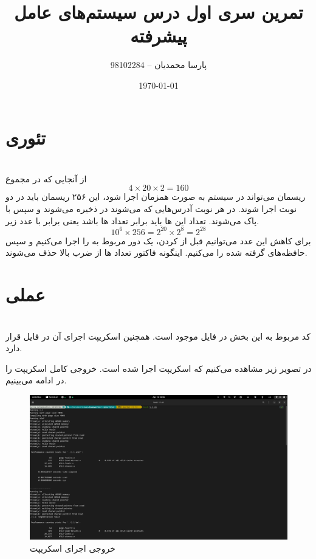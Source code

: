 \documentclass{article}
\title{تمرین سری اول درس سیستم‌های عامل پیشرفته}
\author{پارسا محمدیان -- 98102284}
\date{\today}
\begin{document}
\maketitle

\section*{تئوری}
\section{}
از آنجایی که در مجموع 
$$
4 \times 20 \times 2 = 160
$$
ریسمان می‌تواند در سیستم به صورت همزمان اجرا شود، این ۲۵۶ ریسمان باید در 
دو نوبت اجرا شوند. در هر نوبت آدرس‌هایی که 
می‌شوند در 
ذخیره می‌شوند و سپس با 
پاک می‌شوند. تعداد این 
ها 
باید برابر تعداد 
ها 
باشد یعنی برابر با عدد زیر.
$$
10^6 \times 256 = 2^20 \times 2^8 = 2^{28}
$$
برای کاهش این عدد می‌توانیم قبل از 
کردن،‌ یک دور 
مربوط به 
را اجرا می‌کنیم و سپس حافظه‌های گرفته شده را 
می‌کنیم. اینگونه فاکتور تعداد 
ها 
از ضرب بالا حذف می‌شوند.

\section*{عملی}
\setcounter{section}{0}
\section{}
\subsection{}
\subsubsection{}
کد مربوط به این بخش در فایل 
موجود است. همچنین اسکریپت اجرای آن در فایل
قرار دارد.

در تصویر زیر مشاهده می‌کنیم که اسکریپت اجرا شده است.
خروجی کامل اسکریپت را در ادامه می‌بینیم.

\begin{figure}[H]
\centering
\includegraphics[width=\textwidth]{1.1.png}
\caption{خروجی اجرای اسکریپت}
\label{fig:1.1}
\end{figure}
\end{document}
